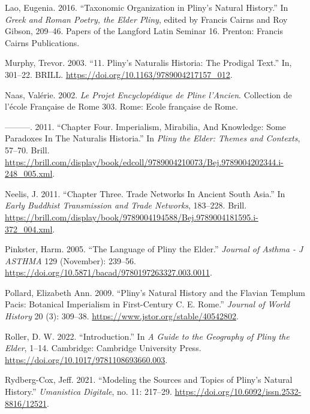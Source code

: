 \documentclass[
  12pt,
]{article}
\newlength{\cslhangindent}
\newlength{\cslentryspacingunit} %
\newenvironment{CSLReferences}[2] %
 {%
  \setlength{\parindent}{0pt}
  \ifodd #1
  \let\oldpar\par
  \def\par{\hangindent=\cslhangindent\oldpar}
  \fi
  \setlength{\parskip}{#2\cslentryspacingunit}
 }%
 {}
\begin{document}
\begin{CSLReferences}{1}{0}
\leavevmode{}%
Lao, Eugenia. 2016. {``Taxonomic {Organization} in {Pliny}'s {Natural}
{History}.''} In \emph{Greek and {Roman} Poetry, the {Elder} {Pliny}},
edited by Francis Cairns and Roy Gibson, 209--46. Papers of the
{Langford} {Latin} {Seminar} 16. Prenton: Francis Cairns Publications.

\leavevmode{}%
Murphy, Trevor. 2003. {``11. Pliny{'}s Naturalis Historia: The Prodigal
Text.''} In, 301--22. BRILL.
\url{https://doi.org/10.1163/9789004217157_012}.

\leavevmode{}%
Naas, Valérie. 2002. \emph{Le Projet Encyclopédique de {Pline}
l'{Ancien}}. Collection de l'école Française de {Rome} 303. Rome: Ecole
française de Rome.

\leavevmode{}%
---------. 2011. {``Chapter {Four}. {Imperialism}, {Mirabilia}, {And}
{Knowledge}: {Some} {Paradoxes} {In} {The} {Naturalis} {Historia}.''} In
\emph{Pliny the {Elder}: {Themes} and {Contexts}}, 57--70. Brill.
\url{https://brill.com/display/book/edcoll/9789004210073/Bej.9789004202344.i-248_005.xml}.

\leavevmode{}%
Neelis, J. 2011. {``Chapter {Three}. {Trade} {Networks} {In} {Ancient}
{South} {Asia}.''} In \emph{Early {Buddhist} {Transmission} and {Trade}
{Networks}}, 183--228. Brill.
\url{https://brill.com/display/book/9789004194588/Bej.9789004181595.i-372_004.xml}.

\leavevmode{}%
Pinkster, Harm. 2005. {``The {Language} of {Pliny} the {Elder}.''}
\emph{Journal of Asthma - J ASTHMA} 129 (November): 239--56.
\url{https://doi.org/10.5871/bacad/9780197263327.003.0011}.

\leavevmode{}%
Pollard, Elizabeth Ann. 2009. {``Pliny's {Natural} {History} and the
{Flavian} {Templum} {Pacis}: {Botanical} {Imperialism} in
{First}-{Century} {C}. {E}. {Rome}.''} \emph{Journal of World History}
20 (3): 309--38. \url{https://www.jstor.org/stable/40542802}.

\leavevmode{}%
Roller, D. W. 2022. {``Introduction.''} In \emph{A {Guide} to the
{Geography} of {Pliny} the {Elder}}, 1--14. Cambridge: Cambridge
University Press. \url{https://doi.org/10.1017/9781108693660.003}.

\leavevmode{}%
Rydberg-Cox, Jeff. 2021. {``Modeling the {Sources} and {Topics} of
{Pliny}'s {Natural} {History}.''} \emph{Umanistica Digitale}, no. 11:
217--29. \url{https://doi.org/10.6092/issn.2532-8816/12521}.


\end{CSLReferences}
\end{document}
